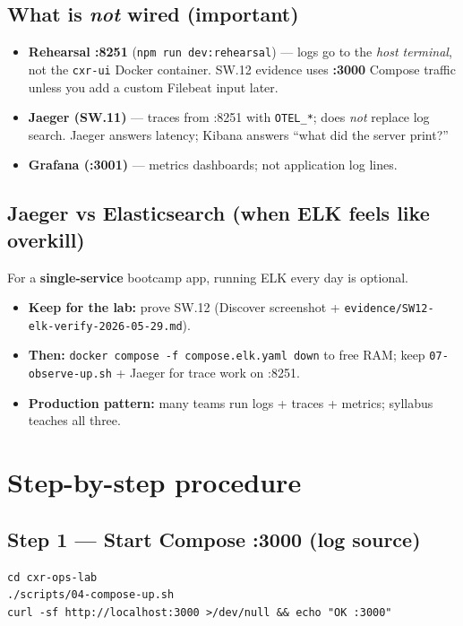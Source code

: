 \documentclass[11pt,a4paper]{report}
\begin{document}
\section{What is \emph{not} wired (important)}

\begin{itemize}
  \item \textbf{Rehearsal :8251} (\texttt{npm run dev:rehearsal}) --- logs go to the \emph{host terminal}, not the \texttt{cxr-ui} Docker container. SW.12 evidence uses \textbf{:3000} Compose traffic unless you add a custom Filebeat input later.
  \item \textbf{Jaeger (SW.11)} --- traces from :8251 with \texttt{OTEL\_*}; does \emph{not} replace log search. Jaeger answers latency; Kibana answers ``what did the server print?''
  \item \textbf{Grafana (:3001)} --- metrics dashboards; not application log lines.
\end{itemize}

\section{Jaeger vs Elasticsearch (when ELK feels like overkill)}

For a \textbf{single-service} bootcamp app, running ELK every day is optional.
\begin{itemize}
  \item \textbf{Keep for the lab:} prove SW.12 (Discover screenshot + \texttt{evidence/SW12-elk-verify-2026-05-29.md}).
  \item \textbf{Then:} \texttt{docker compose -f compose.elk.yaml down} to free RAM; keep \texttt{07-observe-up.sh} + Jaeger for trace work on :8251.
  \item \textbf{Production pattern:} many teams run logs + traces + metrics; syllabus teaches all three.
\end{itemize}

\chapter{Step-by-step procedure}

\section{Step 1 --- Start Compose :3000 (log source)}
\begin{lstlisting}[style=bash]
cd cxr-ops-lab
./scripts/04-compose-up.sh
curl -sf http://localhost:3000 >/dev/null && echo "OK :3000"
\end{lstlisting}
\end{document}
